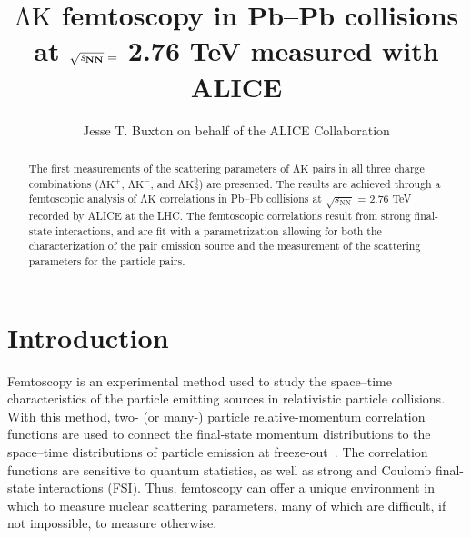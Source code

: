 \documentclass{svproc}
\newcommand{\LamK}{$\mathrm{\Lambda}\mathrm{K}$\xspace}
\newcommand{\LamKchP}{$\mathrm{\Lambda}\mathrm{K^{+}}$\xspace}
\newcommand{\LamKchM}{$\mathrm{\Lambda}\mathrm{K^{-}}$\xspace}
\newcommand{\LamKs}{$\mathrm{\Lambda}\mathrm{K^{0}_{S}}$\xspace}
\begin{document}
\mainmatter              %
%
\title{\LamK femtoscopy in Pb--Pb collisions at $\mathbf{\sqrt{{\textit s}_{NN}}} =$ 2.76 TeV measured with ALICE}

%
\titlerunning{\LamK femtoscopy in Pb--Pb collisions}  %
%
\author{Jesse T. Buxton on behalf of the ALICE Collaboration}
%
%

%

\maketitle              %

\begin{abstract}
The first measurements of the scattering parameters of \LamK pairs in all three charge combinations (\LamKchP, \LamKchM, and \LamKs) are presented.
The results are achieved through a femtoscopic analysis of \LamK correlations in Pb--Pb collisions at $\sqrt{s_{\mathrm{NN}}}$ = 2.76 TeV recorded by ALICE at the LHC.  
The femtoscopic correlations result from strong final-state interactions, and are fit with a parametrization allowing for both the characterization of the pair emission source and the measurement of the scattering parameters for the particle pairs.

\end{abstract}
%


\section{Introduction}
\label{sec:Introduction}

Femtoscopy is an experimental method used to study the space--time characteristics of the particle emitting sources in relativistic particle collisions.  
With this method, two- (or many-) particle relative-momentum correlation functions are used to connect the final-state momentum distributions to the space--time distributions of particle emission at freeze-out~\cite{Lisa:2005dd}.
The correlation functions are sensitive to quantum statistics, as well as strong and Coulomb final-state interactions (FSI).  
Thus, femtoscopy can offer a unique environment in which to measure nuclear scattering parameters, many of which are difficult, if not impossible, to measure otherwise.  
\end{document}
